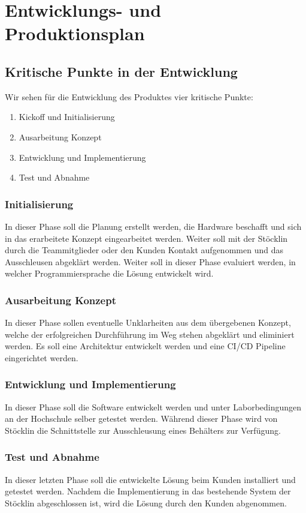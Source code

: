 \chapter{Entwicklungs- und Produktionsplan}

\section{Kritische Punkte in der Entwicklung}
Wir sehen für die Entwicklung des Produktes vier kritische Punkte:
\begin{enumerate}
	\item Kickoff und Initialisierung
	\item Ausarbeitung Konzept
	\item Entwicklung und Implementierung
	\item Test und Abnahme
\end{enumerate}

\subsection{Initialisierung}
In dieser Phase soll die Planung erstellt werden, die Hardware beschafft und sich in das erarbeitete Konzept eingearbeitet werden. Weiter soll mit der Stöcklin durch die Teammitglieder oder den Kunden Kontakt aufgenommen und das Ausschleusen abgeklärt werden. Weiter soll in dieser Phase evaluiert werden, in welcher Programmiersprache die Lösung entwickelt wird.

\subsection{Ausarbeitung Konzept}
In dieser Phase sollen eventuelle Unklarheiten aus dem übergebenen Konzept, welche der erfolgreichen Durchführung im Weg stehen abgeklärt und eliminiert werden. Es soll eine Architektur entwickelt werden und eine CI/CD Pipeline eingerichtet werden.

\subsection{Entwicklung und Implementierung}
In dieser Phase soll die Software entwickelt werden und unter Laborbedingungen an der Hochschule selber getestet werden. Während dieser Phase wird von Stöcklin die Schnittstelle zur Ausschleusung eines Behälters zur Verfügung.

\subsection{Test und Abnahme}
In dieser letzten Phase soll die entwickelte Lösung beim Kunden installiert und getestet werden. Nachdem die Implementierung in das bestehende System der Stöcklin abgeschlossen ist, wird die Lösung durch den Kunden abgenommen.

